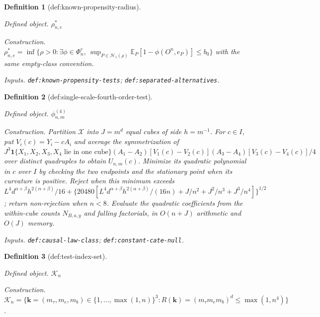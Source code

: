 \documentclass{article}
\newtheorem{definition}{Definition}
\begin{document}
\begin{definition}[def:known-propensity-radius]\label{def:known-propensity-radius}
\par\smallskip\noindent\emph{Defined object.} \(\rho_{n,e}^*\)
\par\smallskip\noindent\emph{Construction.} \(\rho_{n,e}^*=\inf\{\rho>0:\exists\phi\in\Phi_n^e,\ \sup_{P\in\mathcal H_1(\rho)}\mathbb E_P[1-\phi(O^n,e_P)]\le b_0\}\) with the same empty-class convention.
\par\smallskip\noindent\emph{Inputs.} \texttt{def:\allowbreak{}known-\allowbreak{}propensity-\allowbreak{}tests}; \texttt{def:\allowbreak{}separated-\allowbreak{}alternatives}.
\end{definition}

\begin{definition}[def:single-scale-fourth-order-test]\label{def:single-scale-fourth-order-test}
\par\smallskip\noindent\emph{Defined object.} \(\phi_{n,m}^{(4)}\)
\par\smallskip\noindent\emph{Construction.} Partition \(\mathcal X\) into \(J=m^d\) equal cubes of side \(h=m^{-1}\). For \(c\in I\), put \(V_i(c)=Y_i-cA_i\) and average the symmetrization of \(J^3\mathbf 1\{X_1,X_2,X_3,X_4\text{ lie in one cube}\}(A_1-A_2)[V_1(c)-V_2(c)](A_3-A_4)[V_3(c)-V_4(c)]/4\) over distinct quadruples to obtain \(U_{n,m}(c)\). Minimize its quadratic polynomial in \(c\) over \(I\) by checking the two endpoints and the stationary point when its curvature is positive. Reject when this minimum exceeds \(L^4d^{\alpha+\beta}h^{2(\alpha+\beta)}/16+\{20480[L^4d^{\alpha+\beta}h^{2(\alpha+\beta)}/(16n)+J/n^2+J^2/n^3+J^3/n^4]\}^{1/2}\); return non-rejection when \(n<8\). Evaluate the quadratic coefficients from the within-cube counts \(N_{B,a,y}\) and falling factorials, in \(O(n+J)\) arithmetic and \(O(J)\) memory.
\par\smallskip\noindent\emph{Inputs.} \texttt{def:\allowbreak{}causal-\allowbreak{}law-\allowbreak{}class}; \texttt{def:\allowbreak{}constant-\allowbreak{}cate-\allowbreak{}null}.
\end{definition}

\begin{definition}[def:test-index-set]\label{def:test-index-set}
\par\smallskip\noindent\emph{Defined object.} \(\mathcal K_n\)
\par\smallskip\noindent\emph{Construction.} \(\mathcal K_n=\{\mathbf k=(m_\tau,m_e,m_b)\in\{1,\ldots,\max(1,n)\}^3:R(\mathbf k)=(m_\tau m_e m_b)^d\le\max(1,n^4)\}\).
\end{definition}
\end{document}
